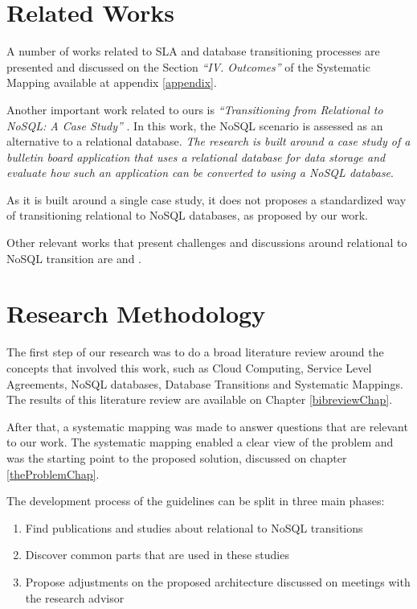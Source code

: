 \section{Related Works}

A number of works related to SLA and database transitioning processes are presented and discussed on the  Section \textit{``IV. Outcomes''} of the Systematic Mapping available at appendix \ref{appendix}. 

Another important work related to ours is \textit{``Transitioning from Relational to NoSQL: A Case Study''} \cite{mcphillips2012transitioning}. In this work, the NoSQL scenario is assessed as an alternative to a relational database. \textit{The research is built around a case study of a bulletin board application that uses a relational database for data storage and evaluate how such an application can be converted to using a NoSQL database}. 

As it is built around a single case study, it does not proposes a standardized way of transitioning relational to NoSQL databases, as proposed by our work. 

Other relevant works that present challenges and  discussions around relational to NoSQL transition are \cite{padhy2011rdbms} and \cite{Schram:2012:MND:2384716.2384773}.


\section{Research Methodology}

The first step of our research was to do a broad literature review around the concepts that involved this work, such as Cloud Computing, Service Level Agreements, NoSQL databases, Database Transitions and Systematic Mappings. The results of this literature review are available on Chapter \ref{bibreviewChap}.

After that, a systematic mapping was made \cite{fabioMartinSM} to answer questions that are relevant to our work. The systematic mapping enabled a clear view of the problem and was the starting point to the proposed solution, discussed on chapter \ref{theProblemChap}.

The development process of the guidelines can be split in three main phases: 

\begin{enumerate}
\item{Find publications and studies about relational to NoSQL transitions}
\item{Discover common parts that are used in these studies}
\item{Propose adjustments on the proposed architecture discussed on meetings with the research advisor}
\end{enumerate}

